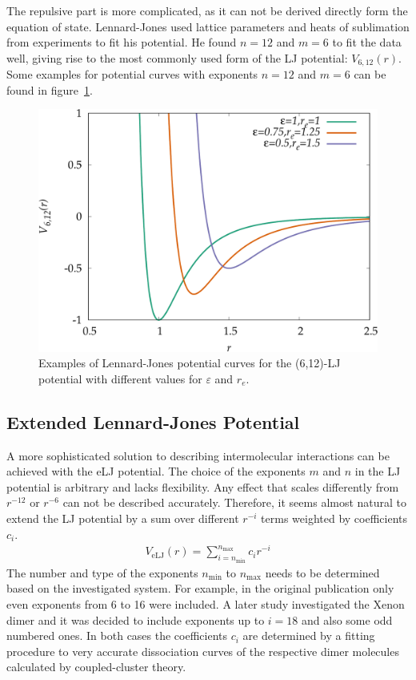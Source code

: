 The repulsive part is more complicated, as it can not be derived directly form
the equation of state. Lennard-Jones used lattice parameters and heats of
sublimation from experiments to fit his potential. He found $n=12$ and $m=6$ to
fit the data well, giving rise to the most commonly used form of the \ac{LJ}
potential: $V_{6,12}(r)$.\autocite{Lennard-Jones_Cohesion_1931} Some examples
for potential curves with exponents $n=12$ and $m=6$ can be found in
figure~\ref{fig:LJ-param}.
%
\begin{figure}[htb]
    \centering
    \includegraphics[width=.8\textwidth]{plot/LJ-param.pdf}
    \caption{Examples of Lennard-Jones potential curves for the (6,12)-\ac{LJ}
    potential with different values for $\varepsilon$ and $r_e$.}
    \label{fig:LJ-param}
\end{figure}

\subsection{Extended Lennard-Jones Potential}
\label{sec:eLJ}

A more sophisticated solution to describing intermolecular interactions can
be achieved with the \acf{eLJ} potential. The choice of the exponents $m$ and $n$ in
the \ac{LJ} potential is arbitrary and lacks flexibility. Any effect that scales
differently from $r^{-12}$ or $r^{-6}$ can not be described accurately.
Therefore, it seems almost natural to extend the \ac{LJ} potential by a sum over
different $r^{-i}$ terms weighted by coefficients $c_i$.
%
\begin{align}
    V_\text{eLJ}(r)=\sum_{i=n_\text{min}}^{n_\text{max}} c_{i}r^{-i}\label{eqn:ELJ}
\end{align}
%
The number and type of the exponents $n_\text{min}$ to $n_\text{max}$ needs to
be determined based on the investigated system. For example, in the original
publication only even exponents from 6 to 16 were
included.\autocite{Schwerdtfeger_ExtensionLennardJonespotential_2006} A later
study investigated the Xenon dimer and it was decided to include exponents up to
$i=18$ and also some odd numbered
ones.\autocite{Jerabek_relativisticcoupledclusterinteraction_2017} In both cases
the coefficients $c_i$ are determined by a fitting procedure to very accurate
dissociation curves of the respective dimer molecules calculated by
coupled-cluster theory.

